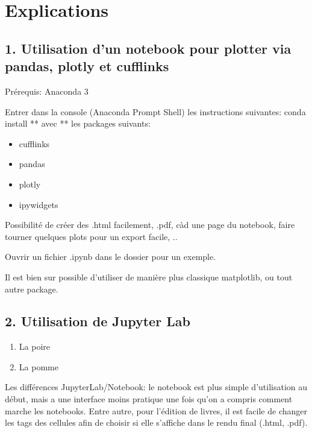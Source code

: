\documentclass[letterpaper,10pt,english]{sphinxmanual}
\begin{document}
\chapter{Explications}
\label{\detokenize{Part2/Explications:explications}}\label{\detokenize{Part2/Explications::doc}}

\section{1. Utilisation d’un notebook pour plotter via pandas, plotly et cufflinks}
\label{\detokenize{Part2/Explications:utilisation-d-un-notebook-pour-plotter-via-pandas-plotly-et-cufflinks}}
Prérequis: Anaconda 3

Entrer dans la console (Anaconda Prompt Shell) les instructions suivantes: conda install ** avec ** les packages suivants:
\begin{itemize}
\item {} 
cufflinks

\item {} 
pandas

\item {} 
plotly

\item {} 
ipywidgets

\end{itemize}

Possibilité de créer des .html facilement, .pdf, càd une page du notebook, faire tourner quelques plots pour un export facile, ..

Ouvrir un fichier .ipynb dans le dossier pour un exemple.

Il est bien sur possible d’utiliser de manière plus classique matplotlib, ou tout autre package.


\section{2. Utilisation de Jupyter Lab}
\label{\detokenize{Part2/Explications:utilisation-de-jupyter-lab}}\begin{enumerate}
%
\item {} 
La poire

\item {} 
La pomme

\end{enumerate}

Les différences JupyterLab/Notebook: le notebook est plus simple d’utilisation au début, mais a une interface moins pratique une fois qu’on a compris comment marche les notebooks. Entre autre, pour l’édition de livres, il est facile de changer les tags des cellules afin de choisir si elle s’affiche dans le rendu final (.html, .pdf).
\end{document}
